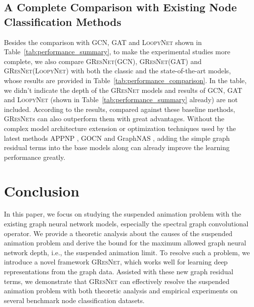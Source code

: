 \documentclass{article}
\newcommand{\gresnet}{\textsc{GResNet}}
\newcommand{\gcn}{\textsc{GCN}}
\newcommand{\gat}{\textsc{GAT}}
\newcommand{\loopy}{\textsc{LoopyNet}}
\begin{document}
\vspace{-8pt}
\subsection{A Complete Comparison with Existing Node Classification Methods}
\vspace{-8pt}

Besides the comparison with {\gcn}, {\gat} and {\loopy} shown in Table~\ref{tab:performance_summary}, to make the experimental studies more complete, we also compare {\gresnet}({\gcn}), {\gresnet}({\gat}) and {\gresnet}({\loopy}) with both the classic and the state-of-the-art models, whose results are provided in Table~\ref{tab:performance_comparison}. In the table, we didn't indicate the depth of the {\gresnet} models and results of {\gcn}, {\gat} and {\loopy} (shown in Table~\ref{tab:performance_summary} already) are not included. According to the results, compared against these baseline methods, {\gresnet}s can also outperform them with great advantages. Without the complex model architecture extension or optimization techniques used by the latest methods APPNP \cite{KBG19}, GOCN \cite{JZTL19} and GraphNAS \cite{GYZZH19}, adding the simple graph residual terms into the base models along can already improve the learning performance greatly.


















\vspace{-8pt}
\section{Conclusion}\label{sec:conclusion}
\vspace{-8pt}

In this paper, we focus on studying the suspended animation problem with the existing graph neural network models, especially the spectral graph convolutional operator. We provide a theoretic analysis about the causes of the suspended animation problem and derive the bound for the maximum allowed graph neural network depth, i.e., the suspended animation limit. To resolve such a problem, we introduce a novel framework {\gresnet}, which works well for learning deep representations from the graph data. Assisted with these new graph residual terms, we demonstrate that {\gresnet} can effectively resolve the suspended animation problem with both theoretic analysis and empirical experiments on several benchmark node classification datasets.
\end{document}
